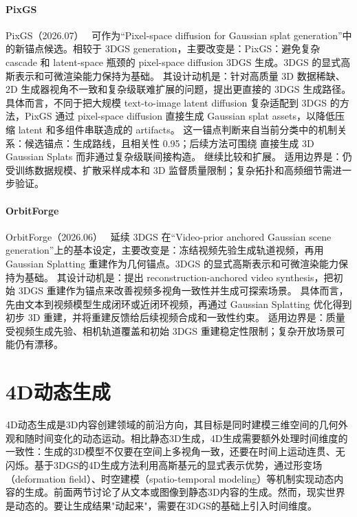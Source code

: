 \paragraph{PixGS}
PixGS（2026.07）~\cite{2607_01803} 可作为“Pixel-space diffusion for Gaussian splat generation”中的新锚点候选。相较于 3DGS generation，主要改变是：PixGS：避免复杂 cascade 和 latent-space 瓶颈的 pixel-space diffusion 3DGS 生成。3DGS 的显式高斯表示和可微渲染能力保持为基础。
其设计动机是：针对高质量 3D 数据稀缺、2D 生成器视角不一致和复杂级联难扩展的问题，提出更直接的 3DGS 生成路径。
具体而言，不同于把大规模 text-to-image latent diffusion 复杂适配到 3DGS 的方法，PixGS 通过 pixel-space diffusion 直接生成 Gaussian splat assets，以降低压缩 latent 和多组件串联造成的 artifacts。
这一锚点判断来自当前分类中的机制关系：候选锚点：生成路线，且相关性 0.95；后续方法可围绕 直接生成 3D Gaussian Splats 而非通过复杂级联间接构造。 继续比较和扩展。
适用边界是：仍受训练数据规模、扩散采样成本和 3D 监督质量限制；复杂拓扑和高频细节需进一步验证。

\paragraph{OrbitForge}
OrbitForge（2026.06）~\cite{2606_24799} 延续 3DGS 在“Video-prior anchored Gaussian scene generation”上的基本设定，主要改变是：冻结视频先验生成轨道视频，再用 Gaussian Splatting 重建作为几何锚点。3DGS 的显式高斯表示和可微渲染能力保持为基础。
其设计动机是：提出 reconstruction-anchored video synthesis，把初始 3DGS 重建作为锚点来改善视频多视角一致性并生成可探索场景。
具体而言，先由文本到视频模型生成闭环或近闭环视频，再通过 Gaussian Splatting 优化得到初步 3D 重建，并将重建反馈给后续视频合成和一致性约束。
适用边界是：质量受视频生成先验、相机轨道覆盖和初始 3DGS 重建稳定性限制；复杂开放场景可能仍有漂移。
\section{4D动态生成}
\label{sec:08_3}

4D动态生成是3D内容创建领域的前沿方向，其目标是同时建模三维空间的几何外观和随时间变化的动态运动。相比静态3D生成，4D生成需要额外处理时间维度的一致性：生成的3D模型不仅要在空间上多视角一致，还要在时间上运动连贯、无闪烁。基于3DGS的4D生成方法利用高斯基元的显式表示优势，通过形变场（deformation field）、时空建模（spatio-temporal modeling）等机制实现动态内容的生成。前面两节讨论了从文本或图像到静态3D内容的生成。然而，现实世界是动态的。要让生成结果"动起来"，需要在3DGS的基础上引入时间维度。

